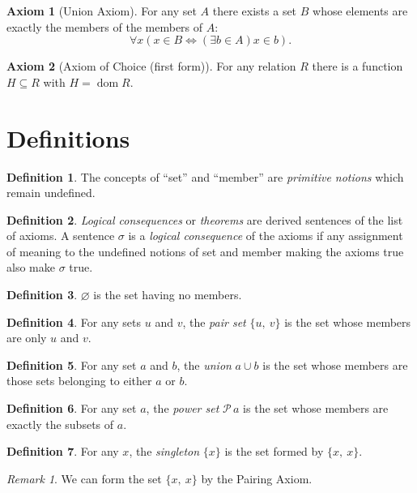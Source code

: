 \documentclass[12pt]{article}
\theoremstyle{plain}
\theoremstyle{remark}
\theoremstyle{definition}
\newtheorem{axiom}{Axiom}[section]
\newtheorem{defn}{Definition}[section]
\theoremstyle{remark}
\newtheorem*{remark}{Remark}
\newcommand{\powerset}{\mathscr{P}\,}
\DeclareMathOperator{\dom}{dom}
\begin{document}
\begin{axiom}[Union Axiom]
For any set $A$ there exists a set $B$ whose elements are exactly the members of the members of $A$:
\[
\forall x(x \in B \Leftrightarrow (\exists b \in A) x \in b).
\]
\end{axiom}

\begin{axiom}[Axiom of Choice (first form)]
For any relation $R$ there is a function $H \subseteq R$ with $H = \dom{R}$.
\end{axiom}

\section{Definitions}
\begin{defn}
The concepts of ``set'' and ``member'' are \textit{primitive notions} which remain undefined.
\end{defn}

\begin{defn}
\textit{Logical consequences} or \textit{theorems} are derived sentences of the list of axioms. A sentence $\sigma$ is a \textit{logical consequence} of the axioms if any assignment of meaning to the undefined notions of set and member making the axioms true also make $\sigma$ true.
\end{defn}

\begin{defn}\label{emptyset}
$\varnothing$ is the set having no members.
\end{defn}

\begin{defn} For any sets $u$ and $v$, the \textit{pair set} $\{u,\ v\}$ is the set whose members are only $u$ and $v$.
\end{defn}

\begin{defn}
For any set $a$ and $b$, the \textit{union} $a \cup b$ is the set whose members are those sets belonging to either $a$ or $b$.
\end{defn}

\begin{defn}
For any set $a$, the \textit{power set} $\powerset a$ is the set whose members are exactly the subsets of $a$.
\end{defn}

\begin{defn}
For any $x$, the \textit{singleton} $\{x\}$ is the set formed by $\{x,\ x\}$.
\begin{remark}
We can form the set $\{x,\ x\}$ by the Pairing Axiom.
\end{remark}
\end{defn}
\end{document}
